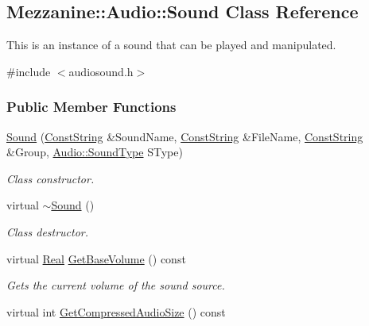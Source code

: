 \hypertarget{classMezzanine_1_1Audio_1_1Sound}{
\subsection{Mezzanine::Audio::Sound Class Reference}
\label{classMezzanine_1_1Audio_1_1Sound}
}


This is an instance of a sound that can be played and manipulated.  




{\ttfamily \#include $<$audiosound.h$>$}

\subsubsection*{Public Member Functions}
\begin{DoxyCompactItemize}
\item 
\hyperlink{classMezzanine_1_1Audio_1_1Sound_ad0739c73fe497ad407642da5597a7599}{Sound} (\hyperlink{namespaceMezzanine_a63cd699ac54b73953f35ec9cfc05e506}{ConstString} \&SoundName, \hyperlink{namespaceMezzanine_a63cd699ac54b73953f35ec9cfc05e506}{ConstString} \&FileName, \hyperlink{namespaceMezzanine_a63cd699ac54b73953f35ec9cfc05e506}{ConstString} \&Group, \hyperlink{namespaceMezzanine_1_1Audio_a316b2244b8be1a8c441a39b0a246295e}{Audio::SoundType} SType)
\begin{DoxyCompactList}\small\item\em Class constructor. \item\end{DoxyCompactList}\item 
virtual \hyperlink{classMezzanine_1_1Audio_1_1Sound_a2aed211bc488b29b38fef7c54c4a7952}{$\sim$Sound} ()
\begin{DoxyCompactList}\small\item\em Class destructor. \item\end{DoxyCompactList}\item 
virtual \hyperlink{namespaceMezzanine_a726731b1a7df72bf3583e4a97282c6f6}{Real} \hyperlink{classMezzanine_1_1Audio_1_1Sound_a59858396263b2f14fa937ff7c10011d7}{GetBaseVolume} () const 
\begin{DoxyCompactList}\small\item\em Gets the current volume of the sound source. \item\end{DoxyCompactList}\item 
virtual int \hyperlink{classMezzanine_1_1Audio_1_1Sound_ac6a79c5326a7a36b39f86604b62ccf98}{GetCompressedAudioSize} () const 

\end{DoxyCompactItemize}
